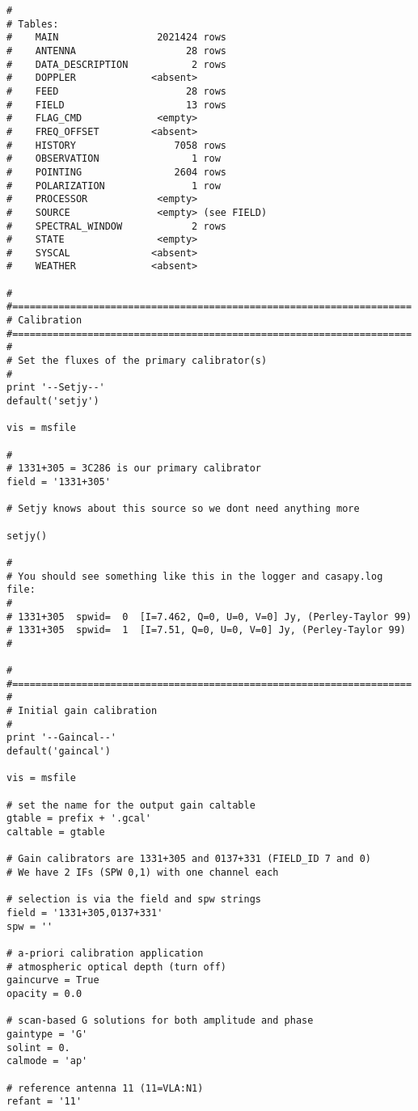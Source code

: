 \begin{verbatim}
# 
# Tables:
#    MAIN                 2021424 rows     
#    ANTENNA                   28 rows     
#    DATA_DESCRIPTION           2 rows     
#    DOPPLER             <absent>  
#    FEED                      28 rows     
#    FIELD                     13 rows     
#    FLAG_CMD             <empty>  
#    FREQ_OFFSET         <absent>  
#    HISTORY                 7058 rows     
#    OBSERVATION                1 row      
#    POINTING                2604 rows     
#    POLARIZATION               1 row      
#    PROCESSOR            <empty>  
#    SOURCE               <empty> (see FIELD)
#    SPECTRAL_WINDOW            2 rows     
#    STATE                <empty>  
#    SYSCAL              <absent>  
#    WEATHER             <absent>  

#
#=====================================================================
# Calibration
#=====================================================================
#
# Set the fluxes of the primary calibrator(s)
#
print '--Setjy--'
default('setjy')

vis = msfile

#
# 1331+305 = 3C286 is our primary calibrator
field = '1331+305'     

# Setjy knows about this source so we dont need anything more

setjy()

#
# You should see something like this in the logger and casapy.log file:
#
# 1331+305  spwid=  0  [I=7.462, Q=0, U=0, V=0] Jy, (Perley-Taylor 99)
# 1331+305  spwid=  1  [I=7.51, Q=0, U=0, V=0] Jy, (Perley-Taylor 99)
# 

#
#=====================================================================
#
# Initial gain calibration
#
print '--Gaincal--'
default('gaincal')

vis = msfile

# set the name for the output gain caltable
gtable = prefix + '.gcal'
caltable = gtable

# Gain calibrators are 1331+305 and 0137+331 (FIELD_ID 7 and 0)
# We have 2 IFs (SPW 0,1) with one channel each

# selection is via the field and spw strings
field = '1331+305,0137+331'
spw = ''

# a-priori calibration application
# atmospheric optical depth (turn off)
gaincurve = True
opacity = 0.0

# scan-based G solutions for both amplitude and phase
gaintype = 'G'
solint = 0.
calmode = 'ap'

# reference antenna 11 (11=VLA:N1)
refant = '11'


\end{verbatim}
